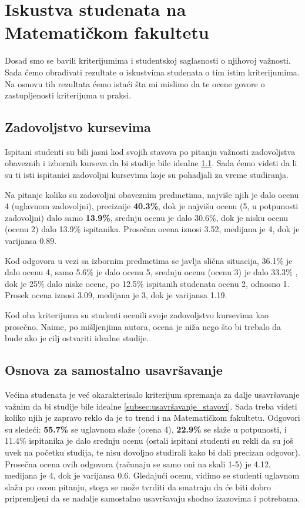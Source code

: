 \documentclass[a4paper]{article}
\begin{document}
{\section{Iskustva studenata na Matematičkom fakultetu}
\label{sec:iskustva}

Dosad smo se bavili kriterijumima i studentskoj saglasnosti o njihovoj važnosti. Sada ćemo obrađivati rezultate o iskustvima studenata o tim istim kriterijumima. Na osnovu tih rezultata ćemo istaći šta mi mislimo da te ocene govore o zastupljenosti kriterijuma u praksi.  

\subsection{Zadovoljstvo kursevima}
\label{subsec:zadovoljstvo_iskustva}
Ispitani studenti su bili jasni kod svojih stavova po pitanju važnosti zadovoljstva obaveznih i izbornih kurseva da bi studije bile idealne \ref{subsec:zadovoljstvo_iskustva}. Sada ćemo videti da li su ti isti ispitanici zadovoljni kursevima koje su pohadjali za vreme studiranja.

Na pitanje koliko su zadovoljni obaveznim predmetima, najviše njih je dalo ocenu 4 (uglavnom zadovoljni), preciznije \textbf{40.3\%}, dok je najvišu ocenu (5, u potpunosti zadovoljni) dalo samo \textbf{13.9\%}, srednju ocenu je dalo 30.6\%, dok je nisku ocenu (ocenu 2) dalo 13.9\% ispitanika. Prosečna ocena iznosi 3.52, medijana je 4, dok je varijansa 0.89.

Kod odgovora u vezi sa izbornim predmetima se javlja slična situacija, 36.1\% je dalo ocenu 4, samo 5.6\% je dalo ocenu 5, srednju ocenu (ocenu 3) je dalo 33.3\% , dok je 25\% dalo niske ocene, po 12.5\% ispitanih studenata ocenu 2, odnosno 1. Prosek ocena iznosi 3.09, medijana je 3, dok je varijansa 1.19. 

Kod oba kriterijuma su studenti ocenili svoje zadovoljstvo kursevima kao prosečno. Naime, po mišljenjima autora, ocena je niža nego što bi trebalo da bude ako je cilj ostvariti idealne studije.

\subsection{Osnova za samostalno usavršavanje}
\label{subsec:usavršavanje_iskustva}
Većina studenata je već okarakterisalo kriterijum spremanja za dalje usavršavanje važnim da bi studije bile idealne \ref{subsec:usavršavanje_stavovi}. Sada treba videti koliko njih je zapravo reklo da je to trend i na Matematičkom fakultetu.
Odgovori su sledeći: \textbf{55.7\%} se uglavnom slaže (ocena 4), \textbf{22.9\%} se slaže u potpunosti, i 11.4\% ispitanika je dalo srednju ocenu (ostali ispitani studenti su rekli da su još uvek na početku studija, te nisu dovoljno studirali kako bi dali precizan odgovor). Prosečna ocena ovih odgovora (računaju se samo oni na skali 1-5) je  4.12, medijana je 4, dok je varijansa 0.6. Gledajući ocenu, vidimo se studenti uglavnom slažu po ovom pitanju, stoga se može tvrditi da smatraju da će biti dobro pripremljeni da se nadalje samostalno usavršavaju shodno izazovima i potrebama.


}
\end{document}
